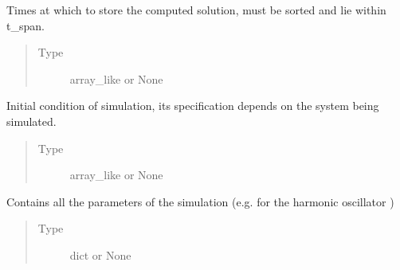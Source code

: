 \documentclass[a4paper,landscape,10pt,english]{sphinxmanual}
\begin{document}
\begin{fulllineitems}
\begin{fulllineitems}
\label{\detokenize{code_docs/simulation_api.simulation:simulation_api.simulation.simulations.Simulation.t_eval}}
Times at which to store the computed solution, must be sorted and
lie within t\_span.
\begin{quote}\begin{description}
\item[{Type}] \leavevmode
array\_like or None

\end{description}\end{quote}

\end{fulllineitems}


\begin{fulllineitems}
\label{\detokenize{code_docs/simulation_api.simulation:simulation_api.simulation.simulations.Simulation.ini_cndtn}}
Initial condition of simulation, its specification depends on
the system being simulated.
\begin{quote}\begin{description}
\item[{Type}] \leavevmode
array\_like or None

\end{description}\end{quote}

\end{fulllineitems}


\begin{fulllineitems}
\label{\detokenize{code_docs/simulation_api.simulation:simulation_api.simulation.simulations.Simulation.params}}
Contains all the parameters of the simulation (e.g. for the harmonic
oscillator )
\begin{quote}\begin{description}
\item[{Type}] \leavevmode
dict or None


\end{description}
\end{quote}
\end{fulllineitems}
\end{fulllineitems}
\end{document}
